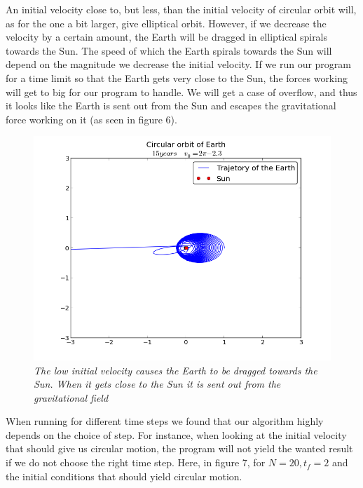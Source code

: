 \documentclass[a4paper,12pt, english]{article}
\begin{document}
An initial velocity close to, but less, than the initial velocity of circular orbit will, as for the one a bit larger, give elliptical orbit. However, if we decrease the velocity by a certain amount, the Earth will be dragged in elliptical spirals towards the Sun. The speed of which the Earth spirals towards the Sun will depend on the magnitude we decrease the initial velocity. If we run our program for a time limit so that the Earth gets very close to the Sun, the forces working will get to big for our program to handle. We will get a case of overflow, and thus it looks like the Earth is sent out from the Sun and escapes the gravitational force working on it (as seen in figure 6).   
     
\begin{figure}[h!]
  \centering
    \includegraphics[scale=0.5]{circular_orbit_3.png}
  \caption{\textit{The low initial velocity causes the Earth to be dragged towards the Sun. When it gets close to the Sun it is sent out from the gravitational field}}
\end{figure}


When running for different time steps we found that our algorithm highly depends on the choice of step. For instance, when looking at the initial velocity that should give us circular motion, the program will not yield the wanted result if we do not choose the right time step. Here, in figure 7, for $N = 20, t_f = 2$ and the initial conditions that should yield circular motion.
  
\end{document}
